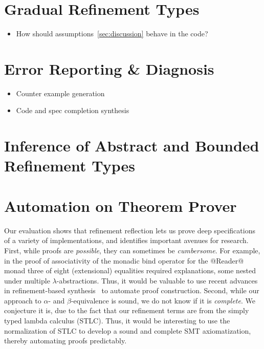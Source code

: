 \section{Gradual Refinement Types}\label{future:gradual}
\begin{itemize}
\item How should assumptions~\ref{sec:discussion} behave in the code? 
\end{itemize}


\section{Error Reporting \& Diagnosis}\label{future:errorreporting}
\begin{itemize}
\item Counter example generation 
\item Code and spec completion synthesis
\end{itemize}

\section{Inference of Abstract and Bounded Refinement Types}


\section{Automation on Theorem Prover}\label{future:theoremproving}
Our evaluation shows that refinement reflection
lets us prove deep specifications of a variety
of implementations, and identifies
important avenues for research.
%
First, while proofs are \emph{possible}, they can
sometimes be \emph{cumbersome}. For example, in
the proof of associativity of the monadic bind
operator for the @Reader@ monad three of eight
(extensional) equalities required explanations,
some nested under multiple $\lambda$-abstractions.
%
Thus, it would be valuable to use recent
advances in refinement-based synthesis~\cite{polikarpova16}
to automate proof construction.
%
Second, while our approach to $\alpha$- and
$\beta$-equivalence is sound, we do not know
if it is \emph{complete}. We conjecture it is,
due to the fact that our refinement terms
are from the simply typed lambda calculus (STLC).
%
Thus, it would be interesting to use the
normalization of STLC to develop a sound
and complete SMT axiomatization, thereby
automating proofs predictably.